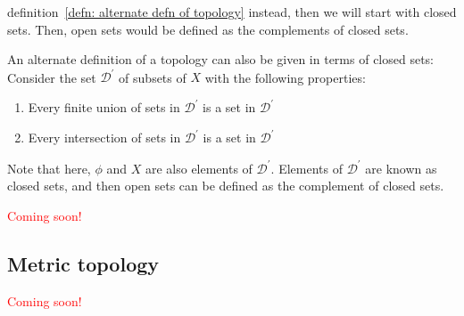     definition~\ref{defn: alternate defn of topology} instead, then we will
    start with closed sets. Then, open sets would be defined as the
    complements of closed sets.
    \begin{definition}
      \label{defn: alternate defn of topology}
      An alternate definition of a topology can also be given in terms of
      closed sets: Consider the set $\mathcal{D}^\prime$ of subsets of $X$ with
      the following properties:
      \begin{enumerate}
        \item{Every finite union of sets in $\mathcal{D}^\prime$ is a set in
        $\mathcal{D}^\prime$}
        \item{Every intersection of sets in $\mathcal{D}^\prime$ is a set in
        $\mathcal{D}^\prime$}
      \end{enumerate}
      Note that here, $\phi$ and $X$ are also elements of
      $\mathcal{D}^\prime$. Elements of $ \mathcal{D}^\prime$ are known as
      closed sets, and then open sets can be defined as the complement of
      closed sets.
    \end{definition}
    \begin{definition}
      \textcolor{red}{Coming soon!}
    \end{definition}
    \subsection{Metric topology}
      \textcolor{red}{Coming soon!}
    
